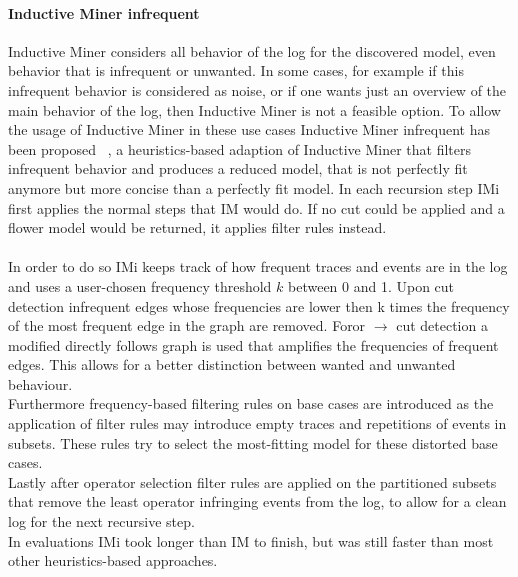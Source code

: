 \documentclass[
	a4paper,
	pagesize,
	pdftex,
	12pt,
	twoside, %
	BCOR=5mm, %
	ngerman,
	fleqn,
	final,
	]{scrartcl}
\begin{document}
\paragraph{Inductive Miner infrequent}
Inductive Miner considers all behavior of the log for the discovered model, even behavior that is infrequent or unwanted. In some cases, for example if this infrequent behavior is considered as noise, or if one wants just an overview of the main behavior of the log, then Inductive Miner is not a feasible option.
To allow the usage of Inductive Miner in these use cases Inductive Miner infrequent has been proposed ~\cite{InductiveMinerInfrequent}, a heuristics-based adaption of Inductive Miner that filters infrequent behavior and produces a reduced model, that is not perfectly fit anymore but more concise than a perfectly fit model.
In each recursion step IMi first applies the normal steps that IM would do. If no cut could be applied and a flower model would be returned, it applies filter rules instead.\\\\
In order to do so IMi keeps track of how frequent traces and events are in the log and uses a user-chosen frequency threshold $k$ between 0 and 1. Upon cut detection infrequent edges whose frequencies are lower then k times the frequency of the most frequent edge in the graph are removed. Foror $\rightarrow$ cut detection a modified directly follows graph is used that amplifies the frequencies of frequent edges. This allows for a better distinction between wanted and unwanted behaviour.\\
Furthermore frequency-based filtering rules on base cases are introduced as the application of filter rules may introduce empty traces and repetitions of events in subsets. These rules try to select the most-fitting model for these distorted base cases.\\
Lastly after operator selection filter rules are applied on the partitioned subsets that remove the least operator infringing events from the log, to allow for a clean log for the next recursive step.\\
In evaluations IMi took longer than IM to finish, but was still faster than most other heuristics-based approaches.
\end{document}
